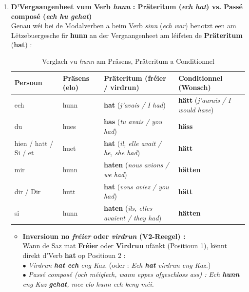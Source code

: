 \begin{enumerate}
    \item \textbf{D'Vergaangenheet vum Verb \textit{hunn} : Präteritum (\textit{ech hat}) vs. Passé composé (\textit{ech hu gehat})} \\
    Genau wéi bei de Modalverben a beim Verb \textit{sinn} (\textit{ech war}) benotzt een am Lëtzebuergesche fir \textbf{hunn} an der Vergaangenheet am léifsten de \textbf{Präteritum} (\textbf{hat}) :
    \begin{table}[htbp]
        \centering
        \begin{tabular}{llll}
            \toprule
            \textbf{Persoun} & \textbf{Präsens (elo)} & \textbf{Präteritum (fréier / virdrun)} & \textbf{Conditionnel (Wonsch)} \\
            \midrule
            ech & hunn & \textbf{hat} (\textit{j'avais / I had}) & \textbf{hätt} (\textit{j'aurais / I would have}) \\
            du & hues & \textbf{has} (\textit{tu avais / you had}) & \textbf{häss} \\
            hien / hatt / Si / et & huet & \textbf{hat} (\textit{il, elle avait / he, she had}) & \textbf{hätt} \\
            mir & hunn & \textbf{haten} (\textit{nous avions / we had}) & \textbf{hätten} \\
            dir / Dir & hutt & \textbf{hat} (\textit{vous aviez / you had}) & \textbf{hätt} \\
            si & hunn & \textbf{haten} (\textit{ils, elles avaient / they had}) & \textbf{hätten} \\
            \bottomrule
        \end{tabular}
        \caption{Verglach vu \textit{hunn} am Präsens, Präteritum a Conditionnel}
    \end{table}
    \begin{itemize}
        \item \textbf{Inversioun no \textit{fréier} oder \textit{virdrun} (V2-Reegel) :} \\
        Wann de Saz mat \textbf{Fréier} oder \textbf{Virdrun} ufänkt (Positioun 1), kënnt direkt d'Verb \textbf{hat} op Positioun 2 : \\
        $\bullet$ \textit{Virdrun \textbf{hat ech} eng Kaz.} (oder : \textit{Ech \textbf{hat} virdrun eng Kaz.}) \\
        $\bullet$ \textit{Passé composé (och méiglech, wann eppes ofgeschloss ass) :} \textit{Ech \textbf{hunn} eng Kaz \textbf{gehat}, mee elo hunn ech keng méi.}
    \end{itemize}
\end{enumerate}

